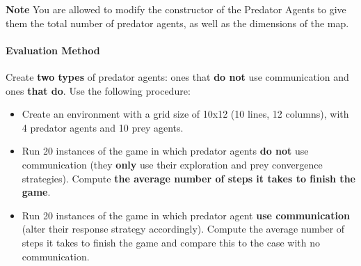 \documentclass[a4paper, 12pt, twoside]{article}
\begin{document}
\textbf{Note} You are allowed to modify the constructor of the Predator Agents to give them the total number of predator agents, as well as the dimensions of the map. 


\paragraph*{\textbf{Evaluation Method}} Create \textbf{two types} of predator agents: ones that \textbf{do not} use communication and ones \textbf{that do}. Use the following procedure:
\begin{itemize}
	\item Create an environment with a grid size of 10x12 (10 lines, 12 columns), with 4 predator agents and 10 prey agents.
	\item Run 20 instances of the game in which predator agents \textbf{do not} use communication (they \textbf{only} use their exploration and prey convergence strategies). Compute \textbf{the average number of steps it takes to finish the game}.
	\item Run 20 instances of the game in which predator agent \textbf{use communication} (alter their response strategy accordingly). Compute the average number of steps it takes to finish the game and compare this to the case with no communication.
\end{itemize}

\clearpage%

\label{page2}
%
\end{document}
